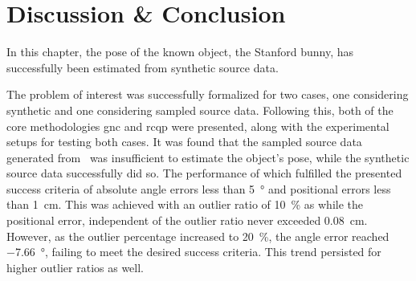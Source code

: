 \section{Discussion \& Conclusion}\label{sec:2-pose-estimation-discussion}


In this chapter, the pose of the known object, the Stanford bunny, has successfully been estimated from synthetic source data. \medskip


The problem of interest was successfully formalized for two cases, one considering synthetic and one considering sampled source data. Following this, both of the core methodologies \gls{gnc} and \gls{rcqp} were presented, along with the experimental setups for testing both cases. It was found that the sampled source data generated from~ was insufficient to estimate the object's pose, while the synthetic source data successfully did so. The performance of which fulfilled the presented success criteria of absolute angle errors less than \SI{5}{\degree} and positional errors less than \SI{1}{cm}. This was achieved with an outlier ratio of \SI{10}{\percent} as  while the positional error, independent of the outlier ratio never exceeded \mvar{\approx} \SI{0.08}{\centi\meter}. However, as the outlier percentage increased to \SI{20}{\percent}, the angle error reached \SI{-7.66}{\degree}, failing to meet the desired success criteria. This trend persisted for higher outlier ratios as well. \medskip

